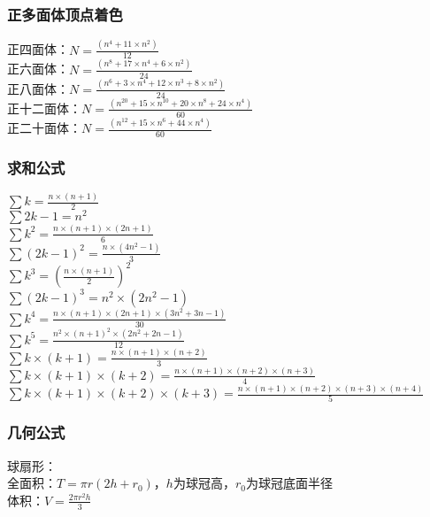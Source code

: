     \subsubsection{正多面体顶点着色}
	正四面体：$N = \frac{(n^{4}+11\times n^{2})}{12}$\\
	正六面体：$N = \frac{(n^{8}+17\times n^{4}+6\times n^{2})}{24}$\\
	正八面体：$N = \frac{(n^{6}+3\times n^{4}+12\times n^{3}+8\times n^{2})}{24}$\\
	正十二面体：$N = \frac{(n^{20}+15\times n^{10}+20\times n^{8}+24\times n^{4})}{60}$\\
	正二十面体：$N = \frac{(n^{12}+15\times n^{6}+44\times n^{4})}{60}$\\
    
    \subsubsection{求和公式}
	$\sum{k} = \frac{n\times (n+1)}{2}$\\
	$\sum{2k-1} = n^{2}$\\
	$\sum{k^{2}} = \frac{n\times (n+1)\times (2n+1)}{6}$\\
	$\sum{(2k-1)^{2}} = \frac{n\times (4n^{2}-1)}{3}$\\
	$\sum{k^{3}} = (\frac{n\times (n+1)}{2})^{2}$\\
	$\sum{(2k-1)^{3}} = n^{2}\times (2n^{2}-1)$\\
	$\sum{k^{4}} = \frac{n\times (n+1)\times (2n+1)\times (3n^{2}+3n-1)}{30}$\\
	$\sum{k^{5}} = \frac{n^{2}\times (n+1)^{2}\times (2n^{2}+2n-1)}{12}$\\
	$\sum{k\times (k+1)} = \frac{n\times (n+1)\times (n+2)}{3}$\\
	$\sum{k\times (k+1)\times (k+2)} = \frac{n\times (n+1)\times (n+2)\times (n+3)}{4}$\\
	$\sum{k\times (k+1)\times (k+2)\times (k+3)} = \frac{n\times (n+1)\times (n+2)\times (n+3)\times (n+4)}{5}$\\
    
    \subsubsection{几何公式}
	球扇形：\\
	全面积：$T = \pi r(2h+r_0)$，$h$为球冠高，$r_0$为球冠底面半径\\
	体积：$V = \frac{2\pi r^{2}h}{3}$\\
    
